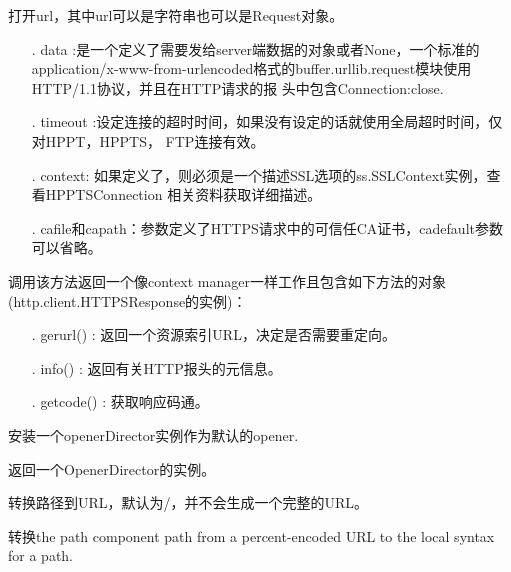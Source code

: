 \noindent{\color{red}{urllib.request.urlopen(url, data=None, [timeout,]*, cafile=None, capath=None, cadefault=False, context=None)\\
:}}
\par{打开url，其中url可以是字符串也可以是Request对象。}\\
\begin{itemize}
\item[.]{data :是一个定义了需要发给server端数据的对象或者None，一个标准的
application/x-www-from-urlencoded格式的buffer.urllib.request模块使用HTTP/1.1协议，并且在HTTP请求的报
头中包含Connection:close.}\\
\item[.]{timeout :设定连接的超时时间，如果没有设定的话就使用全局超时时间，仅对HPPT，HPPTS，
FTP连接有效。}
\item[.]{context: 如果定义了，则必须是一个描述SSL选项的ss.SSLContext实例，查看HPPTSConnection
相关资料获取详细描述。}
\item[.]{cafile和capath：参数定义了HTTPS请求中的可信任CA证书，cadefault参数可以省略。}
\end{itemize}

调用该方法返回一个像context manager一样工作且包含如下方法的对象(http.client.HTTPSResponse的实例)：\\
\begin{itemize}
\item[.]{gerurl() : 返回一个资源索引URL，决定是否需要重定向。}
\item[.]{info() : 返回有关HTTP报头的元信息。}
\item[.]{getcode() : 获取响应码通。}
\end{itemize}

\noindent{\color{red}{urllib.request.install\_opener(opener):}}
\par{安装一个openerDirector实例作为默认的opener.}\\

\noindent{\color{red}{urllib.request.build\_opener([handler, \dots]):}}
\par{返回一个OpenerDirector的实例。}\\

\noindent{\color{red}{urllib.request.pathname2url(path):}}
\par{转换路径到URL，默认为/，并不会生成一个完整的URL。}\\

\noindent{\color{red}{urllib.request.url2pathname(path):}}
\par{转换the path component path from a percent-encoded URL to the local syntax for a path.}\\


